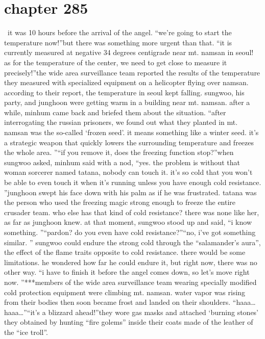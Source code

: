 \section{chapter 285}






 it was 10 hours before the arrival of the angel.
“we’re going to start the temperature now!”but there was something more urgent than that.
“it is currently measured at negative 34 degrees centigrade near mt.
 namsan in seoul! as for the temperature of the center, we need to get close to measure it precisely!”the wide area surveillance team reported the results of the temperature they measured with specialized equipment on a helicopter flying over namsan.
 according to their report, the temperature in seoul kept falling.
sungwoo, his party, and junghoon were getting warm in a building near mt.
 namsan.
after a while, minhum came back and briefed them about the situation.
“after interrogating the russian prisoners, we found out what they planted in mt.
 namsan was the so-called ‘frozen seed’.
 it means something like a winter seed.
 it’s a strategic weapon that quickly lowers the surrounding temperature and freezes the whole area.
”“if you remove it, does the freezing function stop?”when sungwoo asked, minhum said with a nod, “yes.
 the problem is without that woman sorcerer named tatana, nobody can touch it.
 it’s so cold that you won’t be able to even touch it when it’s running unless you have enough cold resistance.
”junghoon swept his face down with his palm as if he was frustrated.
tatana was the person who used the freezing magic strong enough to freeze the entire crusader team.
 who else has that kind of cold resistance? there was none like her, as far as junghoon knew.
at that moment, sungwoo stood up and said, “i know something.
”“pardon? do you even have cold resistance?”“no, i’ve got something similar.
”
sungwoo could endure the strong cold through the “salamander’s aura”, the effect of the flame traits opposite to cold resistance.
 there would be some limitations.
 he wondered how far he could endure it, but right now, there was no other way.
“i have to finish it before the angel comes down, so let’s move right now.
”***members of the wide area surveillance team wearing specially modified cold protection equipment were climbing mt.
 namsan.
 water vapor was rising from their bodies then soon became frost and landed on their shoulders.
“haaa… haaa…”“it’s a blizzard ahead!”they wore gas masks and attached ‘burning stones’ they obtained by hunting “fire golems” inside their coats made of the leather of the “ice troll”.
